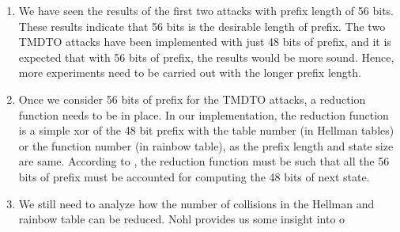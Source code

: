 \begin{enumerate}
\item We have seen the results of the first two attacks with prefix length of 56 bits. These results indicate that 56 bits is the desirable length of prefix. The two TMDTO attacks have been implemented with just 48 bits of prefix, and it is expected that with 56 bits of prefix, the results would be more sound. Hence, more experiments need to be carried out with the longer prefix length.

\item Once we consider 56 bits of prefix for the TMDTO attacks, a reduction function needs to be in place. In our implementation, the reduction function is a simple xor of the 48 bit prefix with the table number (in Hellman tables) or the function number (in rainbow table), as the prefix length and state size are same. According to \cite{email-karsten}, the reduction function must be such that all the 56 bits of prefix must be accounted for computing the 48 bits of next state. 

\item We still need to analyze how the number of collisions in the Hellman and rainbow table can be reduced. Nohl provides us some insight into o
\end{enumerate}